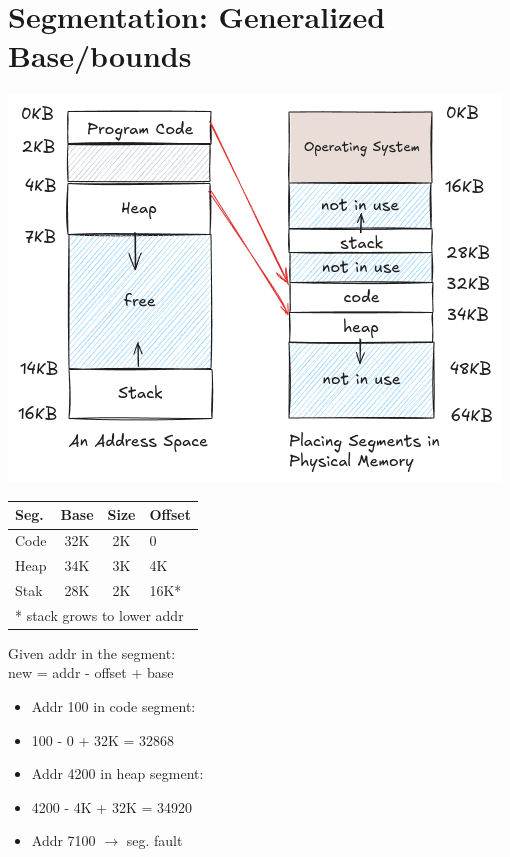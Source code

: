 \section*{Segmentation: Generalized Base/bounds}
\begin{minipage}{.6\linewidth}
  \includegraphics[width=\linewidth]{imgs/addr_map}
\end{minipage}
\begin{minipage}{.4\linewidth}
  \begin{tabular}[th!]{lccl}
    Seg. & Base & Size & Offset\\
    \hline
    Code & 32K  & 2K   & 0     \\
    Heap & 34K  & 3K   & 4K    \\
    Stak & 28K  & 2K   & 16K*   \\
    \hline
    \multicolumn{4}{l}{* stack grows to lower addr} \\
    \hline
  \end{tabular}
  Given addr in the segment:\\
  new = addr \textcolor{err}{-} offset + base
  \begin{itemize}
  \item Addr 100 in code segment:
  \item[] 100 - 0 + 32K = 32868
  \item Addr 4200 in heap segment:
  \item[] 4200 - 4K + 32K = 34920
  \item Addr 7100 $\to$ seg. fault
  \end{itemize}
\end{minipage}
